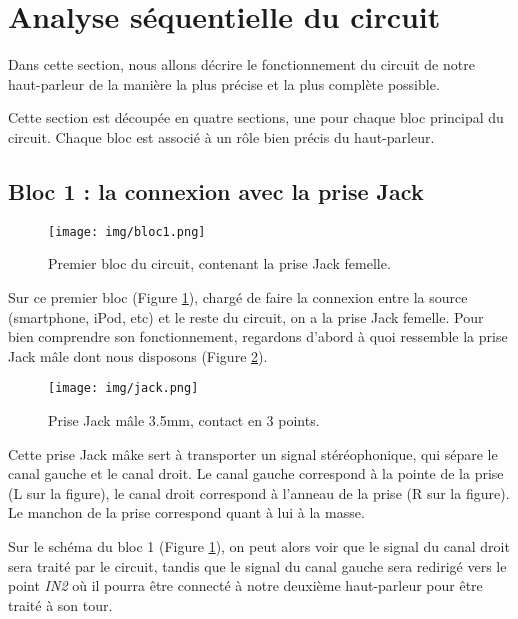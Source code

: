 


\section{Analyse séquentielle du circuit}
Dans cette section, nous allons décrire le fonctionnement du circuit
de notre haut-parleur de la manière la plus précise et la plus complète
possible. 

Cette section est découpée en quatre sections, une pour chaque bloc 
principal du circuit. Chaque bloc est associé à un rôle bien précis du
haut-parleur.

\subsection{Bloc 1 : la connexion avec la prise Jack}

\begin{figure}[h]
	\centering
	\texttt{[image: img/bloc1.png]}
	\caption{Premier bloc du circuit, contenant 
					la prise Jack femelle.}
	\label{bloc1}
\end{figure}

Sur ce premier bloc (Figure \ref{bloc1}), chargé de faire la connexion entre la source (smartphone, iPod, etc) et le reste du circuit, on a la prise Jack femelle. 
Pour bien comprendre son fonctionnement, regardons d'abord à quoi ressemble la prise Jack mâle dont nous disposons (Figure \ref{jack}).

\begin{figure}[h]
	\centering
	\texttt{[image: img/jack.png]}
	\caption{Prise Jack mâle 3.5mm, contact en 3 points.}
	\label{jack}
\end{figure}

Cette prise Jack mâke sert à transporter un signal stéréophonique, qui sépare le canal gauche et le canal droit.
Le canal gauche correspond à la pointe de la prise (L sur la figure), le canal droit correspond à l'anneau de la prise (R sur la figure). Le manchon de la prise correspond quant à lui à la masse.

Sur le schéma du bloc 1 (Figure \ref{bloc1}), on peut alors voir que le signal du canal droit sera traité par le circuit, tandis que le signal du canal gauche sera redirigé vers le point \textit{IN2} où il pourra être connecté à notre deuxième haut-parleur pour être traité à son tour.

